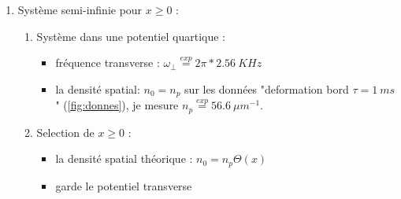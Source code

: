 \documentclass[a3, 10pt,twoside]{article}          %
\theoremstyle{plain}
\theoremstyle{definition}
\theoremstyle{remark}
\theoremstyle{definition} %
\begin{document}
	\begin{minipage}[b]{0.45\textwidth}
			
	\begin{enumerate}[label =\Alph*)]

		\item Système semi-infinie pour $x\geq 0$ :
			\begin{enumerate}[label =\alph*)]
				\item Système dans une potentiel quartique  :
					\begin{itemize}[label =$\bullet$]
						\item fréquence transverse : $\omega_\perp \overset{exp}{=} 2 \pi * 2.56 ~KHz$	
						\item la densité spatial: $n_0 = n_p $  sur les données {\color{blue} "deformation bord $\tau = 1~ ms$" (\ref{fig:donnes}), je mesure   $n_p \overset{exp}{=} 56.6 ~{\mu m}^{-1}$.}
					\end{itemize}
				\item Selection de $x\geq 0$  :
					\begin{itemize}[label =$\bullet$]
						\item la densité spatial théorique : $n_0 = n_p \Theta (x) $  
						\item garde le potentiel transverse
					\end{itemize}

			\end{enumerate}
			

\end{enumerate}
\end{minipage}
\end{document}
